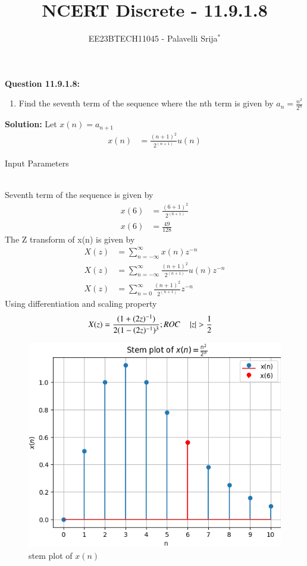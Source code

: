 \documentclass[journal,12pt,twocolumn]{IEEEtran}
\theoremstyle{remark}
\begin{document}

\vspace{3cm}

\title{NCERT Discrete - 11.9.1.8}
\author{EE23BTECH11045 - Palavelli Srija$^{*}$%
}
\maketitle
\newpage
\bigskip

\renewcommand{\thefigure}{\theenumi}
\renewcommand{\thetable}{\theenumi}

\vspace{3cm}
\textbf{Question 11.9.1.8:} 
\begin{enumerate}
\item Find the seventh term of the sequence where the nth term is given by $a_n= \frac {n^2}{2^{n}}$

\end{enumerate}
\textbf{Solution: }
Let $x(n)=a_{n+1}$
\begin{align}
 x(n) &= \frac{(n+1)^2}{2^{(n+1)}}u(n)
\end{align}
\begin{table}[h!]
    \centering
    
    \caption{Input Parameters}
    \label{tab:table1}
   \end{table}
\\Seventh term of the sequence is given by
\begin{align}
x(6) &= \frac{(6+1)^2}{2^{(6+1)}}\\
x(6) &= \frac {49}{128}
\end{align}
The Z transform of x(n) is given by
\begin{align}
X(z) &= \sum_{n=-\infty}^{\infty} x(n)z^{-n}\\
X(z) &= \sum_{n=-\infty}^{\infty} \frac{(n+1)^2}{2^{(n+1)}}u(n) z^{-n}\\
X(z) &= \sum_{n=0}^{\infty} \frac {(n+1)^2}{2^{(n+1)}}z^{-n}
\end{align}
Using differentiation and scaling property
\begin{align}
X(z) &=  \frac {(1+(2z)^{-1})}{2(1-(2z)^{-1})^{3}}; ROC \quad \left\vert z\right\vert > \frac{1}{2}
\end{align}
\begin{figure}[h!]
    \centering
    \includegraphics[width=\columnwidth]{figs/plot.png}
    \caption{stem plot of $x(n)$}
    \label{fig:1}
\end{figure}
\end{document}
